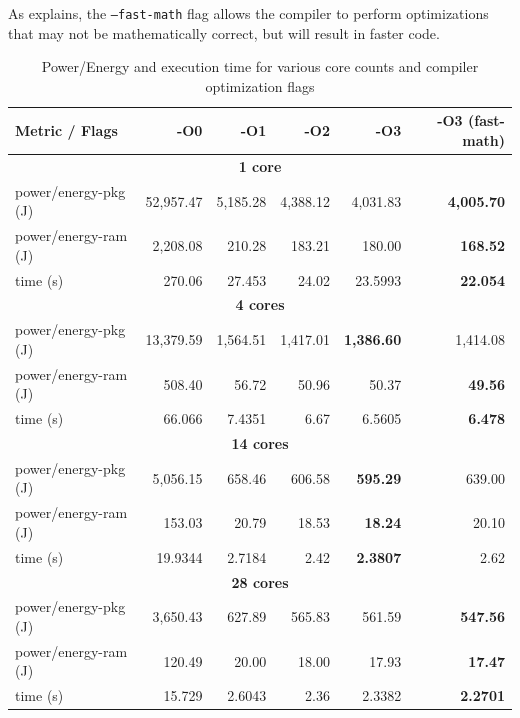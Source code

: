 As \autocite{llvm-fast-math} explains, the \texttt{--fast-math} flag allows the compiler to perform optimizations that may not be mathematically correct, but will result in faster code. 


\begin{table}
  \centering
  \caption{Power/Energy and execution time for various core counts and compiler optimization flags}
  \label{tab:compiler-optimizations}
  \begin{tabular}{lrrrrr}
    \toprule
    \textbf{Metric / Flags} & \textbf{-O0} & \textbf{-O1} & \textbf{-O2} & \textbf{-O3} & \textbf{-O3 (fast-math)} \\
    \midrule
    \multicolumn{6}{c}{\textbf{1 core}} \\
    power/energy-pkg (J) & 52,957.47 & 5,185.28 & 4,388.12 &  4,031.83   & \textbf{4,005.70} \\
    power/energy-ram (J) & 2,208.08  & 210.28   & 183.21   &    180.00   & \textbf{168.52}  \\
    time (s)             & 270.06    & 27.453   & 24.02    &     23.5993 & \textbf{22.054}  \\
    \midrule
    \multicolumn{6}{c}{\textbf{4 cores}} \\
    power/energy-pkg (J) & 13,379.59 & 1,564.51 & 1,417.01 & \textbf{1,386.60} & 1,414.08       \\
    power/energy-ram (J) & 508.40    & 56.72    & 50.96    &     50.37         & \textbf{49.56}  \\
    time (s)             & 66.066    & 7.4351   & 6.67     &    6.5605         & \textbf{6.478}  \\
    \midrule
    \multicolumn{6}{c}{\textbf{14 cores}} \\
    power/energy-pkg (J) & 5,056.15  & 658.46   & 606.58   & \textbf{595.29}  & 639.00         \\
    power/energy-ram (J) & 153.03    & 20.79    & 18.53    & \textbf{18.24}  & 20.10          \\
    time (s)             & 19.9344   & 2.7184   & 2.42     & \textbf{2.3807} & 2.62           \\
    \midrule
    \multicolumn{6}{c}{\textbf{28 cores}} \\
    power/energy-pkg (J) & 3,650.43  & 627.89   & 565.83   &    561.59   & \textbf{547.56} \\
    power/energy-ram (J) & 120.49    & 20.00    & 18.00    &     17.93   & \textbf{17.47}  \\
    time (s)             & 15.729    & 2.6043   & 2.36     &     2.3382  & \textbf{2.2701} \\

\end{tabular}
\end{table}
